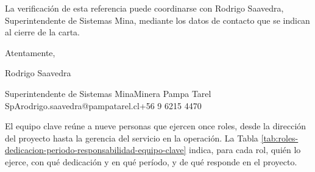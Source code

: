 \documentclass[anexo]{../../comun/overfore}
\begin{document}
La verificación de esta referencia puede coordinarse con Rodrigo Saavedra, Superintendente de Sistemas Mina, mediante los datos de contacto que se indican al cierre de la carta.

Atentamente,

Rodrigo Saavedra

Superintendente de Sistemas Mina\newline Minera Pampa Tarel SpA\newline rodrigo.saavedra@pampatarel.cl\newline +56 9 6215 4470

El equipo clave reúne a nueve personas que ejercen once roles, desde la dirección del proyecto hasta la gerencia del servicio en la operación. La Tabla \ref{tab:roles-dedicacion-periodo-responsabilidad-equipo-clave} indica, para cada rol, quién lo ejerce, con qué dedicación y en qué período, y de qué responde en el proyecto.
\end{document}
